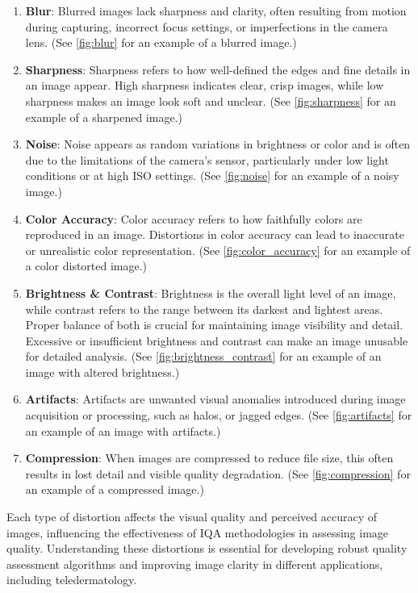 \begin{enumerate}
    \item \textbf{Blur}: Blurred images lack sharpness and clarity, often resulting from motion during capturing, incorrect focus settings, or imperfections in the camera lens. (See \autoref{fig:blur} for an example of a blurred image.)
    \item \textbf{Sharpness}: Sharpness refers to how well-defined the edges and fine details in an image appear. High sharpness indicates clear, crisp images, while low sharpness makes an image look soft and unclear. (See \autoref{fig:sharpness} for an example of a sharpened image.)
    \item \textbf{Noise}: Noise appears as random variations in brightness or color and is often due to the limitations of the camera’s sensor, particularly under low light conditions or at high ISO settings. (See \autoref{fig:noise} for an example of a noisy image.)
    \item \textbf{Color Accuracy}:  Color accuracy refers to how faithfully colors are reproduced in an image. Distortions in color accuracy can lead to inaccurate or unrealistic color representation. (See \autoref{fig:color_accuracy} for an example of a color distorted image.)
    \item \textbf{Brightness \& Contrast}: Brightness is the overall light level of an image, while contrast refers to the range between its darkest and lightest areas. Proper balance of both is crucial for maintaining image visibility and detail. Excessive or insufficient brightness and contrast can make an image unusable for detailed analysis. (See \autoref{fig:brightness_contrast} for an example of an image with altered brightness.)
    \item \textbf{Artifacts}: Artifacts are unwanted visual anomalies introduced during image acquisition or processing, such as halos, or jagged edges. (See \autoref{fig:artifacts} for an example of an image with artifacts.)
    \item \textbf{Compression}: When images are compressed to reduce file size, this often results in lost detail and visible quality degradation. (See \autoref{fig:compression} for an example of a compressed image.)
\end{enumerate}
Each type of distortion affects the visual quality and perceived accuracy of images, influencing the effectiveness of IQA methodologies in assessing image quality. Understanding these distortions is essential for developing robust quality assessment algorithms and improving image clarity in different applications, including teledermatology. \par

